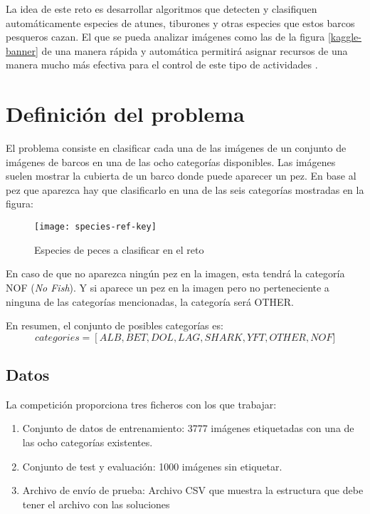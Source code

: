 La idea de este reto es desarrollar algoritmos que detecten y clasifiquen automáticamente especies de atunes, tiburones y otras especies que estos barcos pesqueros cazan. El que se pueda analizar imágenes como las de la figura \ref{kaggle-banner} de una manera rápida y automática permitirá asignar recursos de una manera mucho más efectiva para el control de este tipo de actividades \parencite{kaggle-page}.

\section{Definición del problema}

El problema consiste en clasificar cada una de las imágenes de un conjunto de imágenes de barcos en una de las ocho categorías disponibles. Las imágenes suelen mostrar la cubierta de un barco donde puede aparecer un pez. En base al pez que aparezca hay que clasificarlo en una de las seis categorías mostradas en la figura:

\begin{figure}
  \centering
  \caption{Especies de peces a clasificar en el reto}
\label{kaggle-fishes}
  \texttt{[image: species-ref-key]}
\end{figure}

En caso de que no aparezca ningún pez en la imagen, esta tendrá la categoría NOF (\textit{No Fish}). Y si aparece un pez en la imagen pero no perteneciente a ninguna de las categorías mencionadas, la categoría será OTHER.

En resumen, el conjunto de posibles categorías es:
\[
  categories =
  \left[ALB, BET, DOL, LAG, SHARK, YFT, OTHER, NOF]
\]

\subsection{Datos}

La competición proporciona tres ficheros con los que trabajar:

\begin{enumerate}
  \item{Conjunto de datos de entrenamiento: 3777 imágenes etiquetadas con una de las ocho categorías existentes.}
  \item{Conjunto de test y evaluación: 1000 imágenes sin etiquetar.}
  \item{Archivo de envío de prueba: Archivo CSV que muestra la estructura que debe tener el archivo con las soluciones}
\end{enumerate}

